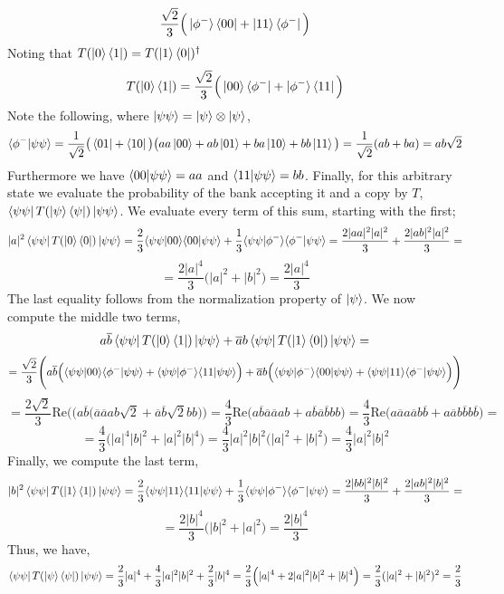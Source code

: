\documentclass[12pt]{article}
\begin{document}
\begin{enumerate}
\begin{enumerate}
$$\frac{\sqrt{2}}{3} \Big(\ket{\phi^-}
\bra{00} + \ket{11} \bra{\phi^-} \Big) $$
Noting that $T(\ket{0} \bra{1}) = T(\ket{1} \bra{0})^\dagger$
$$T(\ket{0} \bra{1}) = 
\frac{\sqrt{2}}{3} 
\Big(
\ket{00}\bra{\phi^-} + \ket{\phi^-} \bra{11} \Big)
$$
Note the following, where $\ket{\psi\psi} = \ket{\psi} \otimes \ket{\psi}$,
$$\langle \phi^- \vert \psi\psi\rangle = \frac{1}{\sqrt{2}}\big(\bra{01} + \bra{10}\big) \big(aa \ket{00} + ab \ket{01} + ba \ket{10} + bb \ket{11} \big) = \frac{1}{\sqrt{2}} (ab + ba) = ab\sqrt{2}$$
Furthermore we have $\langle 00 \vert \psi\psi\rangle = aa$ and $\langle 11 \vert \psi\psi\rangle = bb$.
Finally, for this arbitrary state we evaluate the probability of the bank accepting it and a copy by $T$, $\bra{\psi \psi} T(\ket{\psi} \bra{\psi}) \ket{\psi \psi}$. We evaluate every term of this sum, starting with the first;
$$ 
|a|^2 \bra{\psi \psi} T(\ket{0} \bra{0}) \ket{\psi \psi} = 
\frac{2}{3} \langle \psi \psi \vert 00\rangle\langle 00 \vert \psi \psi\rangle + \frac{1}{3}\langle \psi \psi \vert \phi^-\rangle\langle \phi^- \vert \psi \psi\rangle
= \frac{2|aa|^2|a|^2}{3} + \frac{2|ab|^2|a|^2}{3} =$$
$$ = \frac{2|a|^4}{3}\Big(|a|^2 + |b|^2 \Big) = \frac{2|a|^4}{3} $$
The last equality follows from the normalization property of $\ket{\psi}$. We now compute the middle two terms,
$$
a\overline{b} \bra{\psi \psi} T(\ket{0} \bra{1}) \ket{\psi \psi} + 
\overline{a}b \bra{\psi \psi} T(\ket{1} \bra{0}) \ket{\psi \psi} = $$
$$ = \frac{\sqrt{2}}{3} \Bigg(
a\overline{b} \Big(
\langle \psi \psi \vert 00\rangle\langle \phi^- \vert \psi \psi\rangle + \langle \psi \psi \vert \phi^-\rangle \langle 11 \vert \psi \psi\rangle \Big)
 + \overline{a}b \Big(
\langle \psi \psi \vert \phi^-\rangle
\langle 00 \vert \psi \psi\rangle + \langle \psi \psi \vert 11\rangle \langle \phi^- \vert \psi \psi\rangle \Big) \Bigg)
$$
$$ = \frac{2\sqrt{2}}{3} \text{Re} \Bigg(
\Big(a\overline{b} \Big(
\overline{a}\overline{a} ab\sqrt{2} + \overline{a}\overline{b}\sqrt{2} bb \Big) \Bigg) = \frac{4}{3}\text{Re}\Big( a\overline{b}\overline{a}\overline{a} ab + a\overline{b}\overline{a}\overline{b} bb \Big) = \frac{4}{3}\text{Re}\Big( a\overline{a}a\overline{a} b\overline{b} + a\overline{a}b\overline{b} b\overline{b} \Big) = 
$$
$$ = \frac{4}{3}\Big(|a|^4|b|^2 + |a|^2|b|^4\Big) = \frac{4}{3}|a|^2|b|^2\Big(|a|^2 + |b|^2\Big) = \frac{4}{3}|a|^2|b|^2$$
Finally, we compute the last term,
$$ 
|b|^2 \bra{\psi \psi} T(\ket{1} \bra{1}) \ket{\psi \psi} = 
\frac{2}{3} \langle \psi \psi \vert 11\rangle\langle 11 \vert \psi \psi\rangle + \frac{1}{3}\langle \psi \psi \vert \phi^-\rangle\langle \phi^- \vert \psi \psi\rangle
= \frac{2|bb|^2|b|^2}{3} + \frac{2|ab|^2|b|^2}{3} =$$
$$ = \frac{2|b|^4}{3}\Big(|b|^2 + |a|^2 \Big) = \frac{2|b|^4}{3} $$
Thus, we have,
$$\bra{\psi \psi} T(\ket{\psi} \bra{\psi}) \ket{\psi \psi} = \frac{2}{3}|a|^4 + \frac{4}{3}|a|^2|b|^2 + \frac{2}{3}|b|^4 = \frac{2}{3}\Big( |a|^4 + 2|a|^2|b|^2 + |b|^4 \Big) = \frac{2}{3} (|a|^2 + |b|^2)^2 = \frac{2}{3}$$

\end{enumerate}
\end{enumerate}
\end{document}
